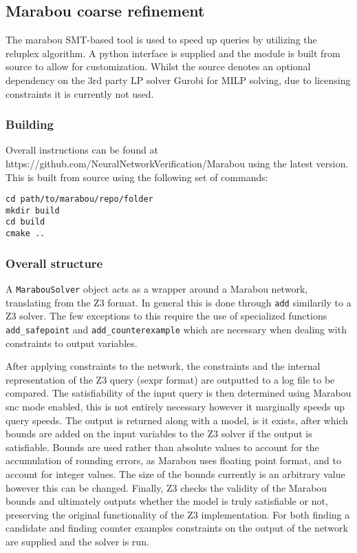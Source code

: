 \documentclass[a4paper,parskip=half]{scrartcl}
\begin{document}
\subsection{Marabou coarse refinement}

The marabou SMT-based tool is used to speed up queries by utilizing the reluplex algorithm. A python interface is supplied and the module is built from source to allow for customization. Whilst the source denotes an optional dependency on the 3rd party LP solver Gurobi for MILP solving, due to licensing constraints it is currently not used.

\subsubsection{Building}

Overall instructions can be found at https://github.com/NeuralNetworkVerification/Marabou using the latest version. This is built from source using the following set of commands:

\begin{verbatim}
cd path/to/marabou/repo/folder
mkdir build 
cd build
cmake ..
\end{verbatim}

\subsubsection{Overall structure}

A \verb+MarabouSolver+ object acts as a wrapper around a Marabou network, translating from the Z3 format. In general this is done through \verb+add+ similarily to a Z3 solver. The few exceptions to this require the use of specialized functions \verb+add_safepoint+ and \verb+add_counterexample+ which are necessary when dealing with constraints to output variables.

After applying constraints to the network, the constraints and the internal representation of the Z3 query (sexpr format) are outputted to a log file to be compared. The satisfiability of the input query is then determined using Marabou snc mode enabled, this is not entirely necessary however it marginally speeds up query speeds. The output is returned along with a model, is it exists, after which bounds are added on the input variables to the Z3 solver if the output is satisfiable. Bounds are used rather than absolute values to account for the accumulation of rounding errors, as Marabou uses floating point format, and to account for integer values. The size of the bounds currently is an arbitrary value however this can be changed. Finally, Z3 checks the validity of the Marabou bounds and ultimately outputs whether the model is truly satisfiable or not, preserving the original functionality of the Z3 implementation. 
For both finding a candidate and finding counter examples constraints on the output of the network are supplied and the solver is run.
\end{document}
